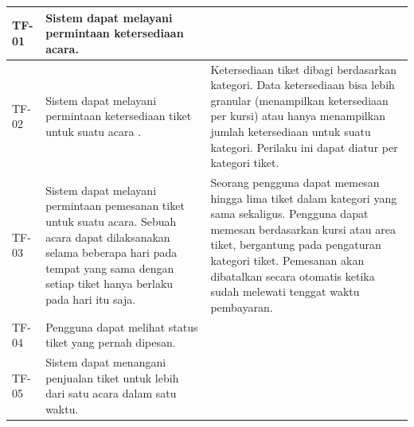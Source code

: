 \begin{longtable}{|l|p{}|p{}|}
    \hline
    TF-01       & Sistem dapat melayani permintaan ketersediaan acara.                                                                                                                                                                            &                                                                                                                                                                                                                                                                                                                                                       \\
    \hline
    TF-02       & Sistem dapat melayani permintaan ketersediaan tiket untuk suatu acara .                                                                                                                                                         & Ketersediaan tiket dibagi berdasarkan kategori. Data ketersediaan bisa lebih granular (menampilkan ketersediaan per kursi) atau hanya menampilkan jumlah ketersediaan untuk suatu kategori. Perilaku ini dapat diatur per kategori tiket.                                                                                                             \\
    \hline
    TF-03       & Sistem dapat melayani permintaan pemesanan tiket untuk suatu acara. Sebuah acara dapat dilaksanakan selama beberapa hari pada tempat yang sama dengan setiap tiket hanya berlaku pada hari itu saja. & Seorang pengguna dapat memesan hingga lima tiket dalam kategori yang sama sekaligus. Pengguna dapat memesan berdasarkan kursi atau area tiket, bergantung pada pengaturan kategori tiket. Pemesanan akan dibatalkan secara otomatis ketika sudah melewati tenggat waktu pembayaran.                                                                   \\
    \hline
    TF-04       & Pengguna dapat melihat status tiket yang pernah dipesan.                                                                                                                                                                        &                                                                                                                                                                                                                                                                                                                                                       \\
    \hline
    TF-05       & Sistem dapat menangani penjualan tiket untuk lebih dari satu acara dalam satu waktu.                                                                                                                                            &                                                                                                                                                                                                                                                                                                                                                       \\

\end{longtable}
\endgroup

